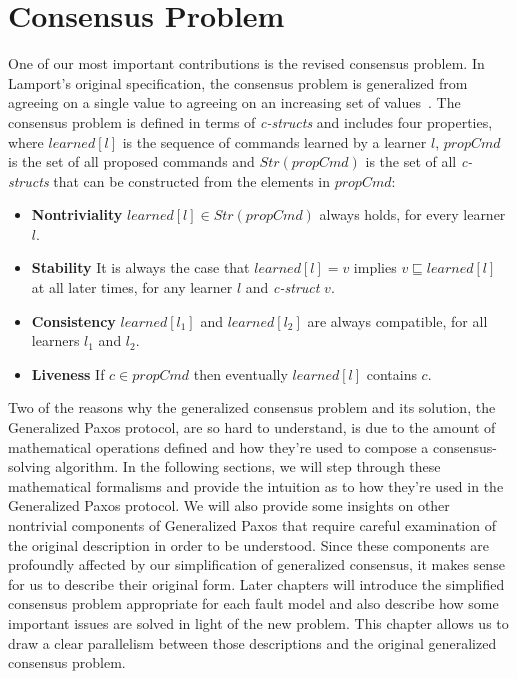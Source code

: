 \chapter{Consensus Problem} \label{problem}

One of our most important contributions is the revised consensus problem. In Lamport's original specification, the consensus problem is generalized from agreeing on a single value to agreeing on an increasing set of values~\cite{Lamport2005}. The consensus problem is defined in terms of \textit{c-structs} and includes four properties, where $learned[l]$ is the sequence of commands learned by a learner $l$, $propCmd$ is the set of all proposed commands and $Str(propCmd)$ is the set of all \textit{c-structs} that can be constructed from the elements in $propCmd$:
\begin{itemize}
	\item \textbf{Nontriviality} $learned[l] \in Str(propCmd)$ always holds, for every learner $l$.
	\item \textbf{Stability} It is always the case that $learned[l] = v$ implies $v \sqsubseteq learned[l]$ at all later times, for any learner $l$ and \textit{c-struct} $v$.
	\item \textbf{Consistency} $learned[l_1]$ and $learned[l_2]$ are always compatible, for all learners $l_1$ and $l_2$.
	\item \textbf{Liveness} If $c \in propCmd$ then eventually $learned[l]$ contains $c$.
\end{itemize}

\par
Two of the reasons why the generalized consensus problem and its solution, the Generalized Paxos protocol, are so hard to understand, is due to the amount of mathematical operations defined and how they're used to compose a consensus-solving algorithm. In the following sections, we will step through these mathematical formalisms and provide the intuition as to how they're used in the Generalized Paxos protocol. We will also provide some insights on other nontrivial components of Generalized Paxos that require careful examination of the original description in order to be understood. Since these components are profoundly affected by our simplification of generalized consensus, it makes sense for us to describe their original form. Later chapters will introduce the simplified consensus problem appropriate for each fault model and also describe how some important issues are solved in light of the new problem. This chapter allows us to draw a clear parallelism between those descriptions and the original generalized consensus problem.

